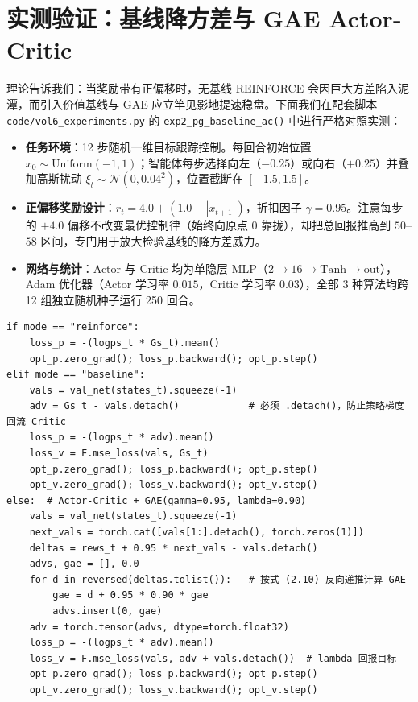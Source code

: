 \section{实测验证：基线降方差与 GAE Actor-Critic}
\label{sec:exp-pg-baseline}

理论告诉我们：当奖励带有正偏移时，无基线 REINFORCE 会因巨大方差陷入泥潭，而引入价值基线与 GAE 应立竿见影地提速稳盘。下面我们在配套脚本 \texttt{code/vol6\_experiments.py} 的 \texttt{exp2\_pg\_baseline\_ac()} 中进行严格对照实测：
\begin{itemize}
  \item \textbf{任务环境}：12 步随机一维目标跟踪控制。每回合初始位置 $x_0 \sim \mathrm{Uniform}(-1, 1)$；智能体每步选择向左（$-0.25$）或向右（$+0.25$）并叠加高斯扰动 $\xi_t \sim \mathcal{N}(0, 0.04^2)$，位置截断在 $[-1.5, 1.5]$。
  \item \textbf{正偏移奖励设计}：$r_t = \mathbf{4.0} + (1.0 - |x_{t+1}|)$，折扣因子 $\gamma = 0.95$。注意每步的 $+4.0$ 偏移不改变最优控制律（始终向原点 $0$ 靠拢），却把总回报推高到 $50$--$58$ 区间，专门用于放大检验基线的降方差威力。
  \item \textbf{网络与统计}：Actor 与 Critic 均为单隐层 MLP（$2 \to 16 \to \text{Tanh} \to \text{out}$），Adam 优化器（Actor 学习率 $0.015$，Critic 学习率 $0.03$），全部 3 种算法均跨 12 组独立随机种子运行 250 回合。
\end{itemize}

\begin{lstlisting}[caption={REINFORCE+基线与 Actor-Critic+GAE($\lambda=0.9$) 核心更新（摘自 \texttt{vol6\_experiments.py}）}]
if mode == "reinforce":
    loss_p = -(logps_t * Gs_t).mean()
    opt_p.zero_grad(); loss_p.backward(); opt_p.step()
elif mode == "baseline":
    vals = val_net(states_t).squeeze(-1)
    adv = Gs_t - vals.detach()            # 必须 .detach()，防止策略梯度回流 Critic
    loss_p = -(logps_t * adv).mean()
    loss_v = F.mse_loss(vals, Gs_t)
    opt_p.zero_grad(); loss_p.backward(); opt_p.step()
    opt_v.zero_grad(); loss_v.backward(); opt_v.step()
else:  # Actor-Critic + GAE(gamma=0.95, lambda=0.90)
    vals = val_net(states_t).squeeze(-1)
    next_vals = torch.cat([vals[1:].detach(), torch.zeros(1)])
    deltas = rews_t + 0.95 * next_vals - vals.detach()
    advs, gae = [], 0.0
    for d in reversed(deltas.tolist()):   # 按式 (2.10) 反向递推计算 GAE
        gae = d + 0.95 * 0.90 * gae
        advs.insert(0, gae)
    adv = torch.tensor(advs, dtype=torch.float32)
    loss_p = -(logps_t * adv).mean()
    loss_v = F.mse_loss(vals, adv + vals.detach())  # lambda-回报目标
    opt_p.zero_grad(); loss_p.backward(); opt_p.step()
    opt_v.zero_grad(); loss_v.backward(); opt_v.step()
\end{lstlisting}

